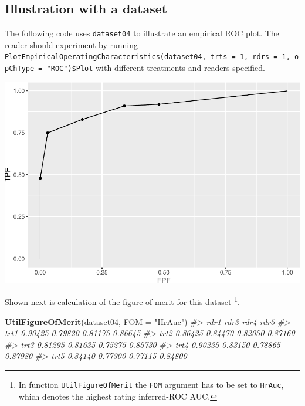 \documentclass[
]{book}
\newenvironment{Shaded}{\begin{snugshade}}{\end{snugshade}}
\newcommand{\CommentTok}[1]{\textcolor[rgb]{0.56,0.35,0.01}{\textit{#1}}}
\newcommand{\DataTypeTok}[1]{\textcolor[rgb]{0.13,0.29,0.53}{#1}}
\newcommand{\DecValTok}[1]{\textcolor[rgb]{0.00,0.00,0.81}{#1}}
\newcommand{\KeywordTok}[1]{\textcolor[rgb]{0.13,0.29,0.53}{\textbf{#1}}}
\newcommand{\NormalTok}[1]{#1}
\newcommand{\OperatorTok}[1]{\textcolor[rgb]{0.81,0.36,0.00}{\textbf{#1}}}
\newcommand{\StringTok}[1]{\textcolor[rgb]{0.31,0.60,0.02}{#1}}
\begin{document}
\hypertarget{empirical-roc-plot-illustration}{%
\subsection{Illustration with a dataset}\label{empirical-roc-plot-illustration}}

The following code uses \texttt{dataset04} to illustrate an empirical ROC plot. The reader should experiment by running \texttt{PlotEmpiricalOperatingCharacteristics(dataset04,\ trts\ =\ 1,\ rdrs\ =\ 1,\ opChType\ =\ "ROC")\$Plot} with different treatments and readers specified.

\begin{Shaded}
\end{Shaded}

\includegraphics{03-empirical_files/figure-latex/unnamed-chunk-4-1.pdf}

Shown next is calculation of the figure of merit for this dataset \footnote{In function \texttt{UtilFigureOfMerit} the \texttt{FOM} argument has to be set to \texttt{HrAuc}, which denotes the highest rating inferred-ROC AUC.}.

\begin{Shaded}
\begin{Highlighting}[]
\KeywordTok{UtilFigureOfMerit}\NormalTok{(dataset04, }\DataTypeTok{FOM =} \StringTok{"HrAuc"}\NormalTok{)}
\CommentTok{#>         rdr1    rdr3    rdr4    rdr5}
\CommentTok{#> trt1 0.90425 0.79820 0.81175 0.86645}
\CommentTok{#> trt2 0.86425 0.84470 0.82050 0.87160}
\CommentTok{#> trt3 0.81295 0.81635 0.75275 0.85730}
\CommentTok{#> trt4 0.90235 0.83150 0.78865 0.87980}
\CommentTok{#> trt5 0.84140 0.77300 0.77115 0.84800}
\end{Highlighting}
\end{Shaded}
\end{document}

